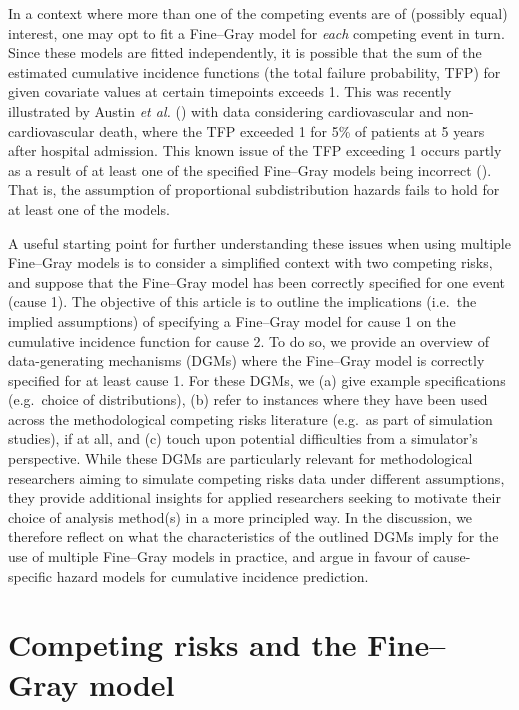 \documentclass[
  letterpaper,
  DIV=11,
  numbers=noendperiod]{scrreprt}
\begin{document}
In a context where more than one of the competing events are of
(possibly equal) interest, one may opt to fit a Fine--Gray model for
\emph{each} competing event in turn. Since these models are fitted
independently, it is possible that the sum of the estimated cumulative
incidence functions (the total failure probability, TFP) for given
covariate values at certain timepoints exceeds 1. This was recently
illustrated by Austin \emph{et al.}
() with data
considering cardiovascular and non-cardiovascular death, where the TFP
exceeded 1 for 5\% of patients at 5 years after hospital admission. This
known issue of the TFP exceeding 1 occurs partly as a result of at least
one of the specified Fine--Gray models being incorrect
(). That is, the assumption of proportional
subdistribution hazards fails to hold for at least one of the models.

A useful starting point for further understanding these issues when
using multiple Fine--Gray models is to consider a simplified context
with two competing risks, and suppose that the Fine--Gray model has been
correctly specified for one event (cause 1). The objective of this
article is to outline the implications (i.e.~the implied assumptions) of
specifying a Fine--Gray model for cause 1 on the cumulative incidence
function for cause 2. To do so, we provide an overview of
data-generating mechanisms (DGMs) where the Fine--Gray model is
correctly specified for at least cause 1. For these DGMs, we (a) give
example specifications (e.g.~choice of distributions), (b) refer to
instances where they have been used across the methodological competing
risks literature (e.g.~as part of simulation studies), if at all, and
(c) touch upon potential difficulties from a simulator's perspective.
While these DGMs are particularly relevant for methodological
researchers aiming to simulate competing risks data under different
assumptions, they provide additional insights for applied researchers
seeking to motivate their choice of analysis method(s) in a more
principled way. In the discussion, we therefore reflect on what the
characteristics of the outlined DGMs imply for the use of multiple
Fine--Gray models in practice, and argue in favour of cause-specific
hazard models for cumulative incidence prediction.

\section{Competing risks and the Fine--Gray
model}\label{competing-risks-and-the-finegray-model}
\end{document}
